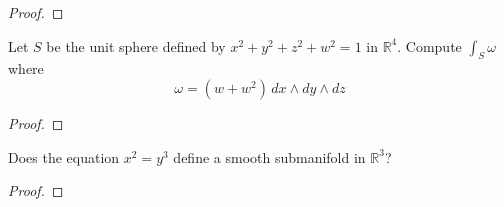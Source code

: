 \documentclass{article}
\newenvironment{problem}[2][Problem]{\begin{trivlist}
\item[\hskip \labelsep {\bfseries #1}\hskip \labelsep {\bfseries #2.}]}{\end{trivlist}}
\begin{document}
\begin{proof}
\end{proof}

\pagebreak

\begin{problem}{6}
  Let $S$ be the unit sphere defined by $x^2 + y^2 + z^2 + w^2 = 1$ in
  $\mathbb{R}^4$. Compute $\int_S\omega$ where \[
    \omega = (w + w^2)\, dx \wedge dy \wedge dz
  \]
\end{problem}

\begin{proof}
\end{proof}

\pagebreak

\begin{problem}{7}
  Does the equation $x^2 = y^3$ define a smooth submanifold in $\mathbb{R}^3$?
\end{problem}

\begin{proof}
\end{proof}
\end{document}
